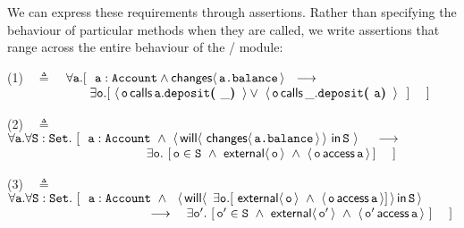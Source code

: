  
We can  express these  requirements  %
through \Chainmail assertions.  Rather than %
specifying the behaviour of particular methods when they are called, we
write  assertions   that range across the entire behaviour of the
/  module: 
\vspace{.2cm}


(1)\ \  $\triangleq$\ \ $\forall \prg{a}.[\ \ \prg{a}:\prg{Account} \wedge \Changes{\prg{a.balance}}  \ \    
    \longrightarrow \ \    \hfill$ \\
  $\strut \hspace{2.3cm} 
  \exists \prg{o}. [\    \Calls{\prg{o}}{\prg{deposit}}{\prg{a}}{\_} \vee\  \Calls{\prg{o}}{\prg{deposit}}{\_}{\prg{a}}\  \ ] \ \ \ \ ] \hfill $

\vspace{.4cm}

    (2)\ \  $\triangleq$\ \ $\forall {\mbox{\tt{a}}}.\forall {\mbox{\tt{S}}}:{\mbox{\tt{Set}}}.\ [  \ \  {\mbox{\tt{a}}}:{\mbox{\tt{Account}}}\ \wedge \  \langle\,  {\mathsf{will}}\langle \,\,{\mathsf{changes}}\langle\,{\mbox{\tt{a.balance}}}\,\rangle\,\rangle \,\, \mathsf{in}\, {\mbox{\tt{S}}}\,\, \rangle\ \ \   \
    \longrightarrow$ \\
 $\strut \hspace{3.9cm} \hfill \exists \prg{o}.\ [\, \prg{o}\in \prg{S}\ \wedge\  \External{\prg{o}}  \ \wedge \ \CanAccess{\prg{o}}{\prg{a}} \, ] \ \ \ \ ]$
\vspace{.4cm} 
 
     (3)\ \  $\triangleq$\ \ $\forall {\mbox{\tt{a}}}.\forall {\mbox{\tt{S}}}:{\mbox{\tt{Set}}}.\ [ \ \  {\mbox{\tt{a}}}:{\mbox{\tt{Account}}}\ \wedge \ \ {\langle\, {\mathsf{will}}\langle \,\ \exists {\mbox{\tt{o}}}.[\ {\mathsf{external}}\langle\, {\mbox{\tt{o}}}\, \rangle \ \wedge\ \langle\, {\mbox{\tt{o}}}\, \mathsf{access}\, {\mbox{\tt{a}}}\, \rangle]\,\rangle\, \mathsf{in}\, {{\mbox{\tt{S}}}}\, \rangle}$ \\  
 $\strut \hspace{3.9cm} \hfill   \longrightarrow \ \ \ \exists \prg{o}'.\ [\, \prg{o}'\in \prg{S}\  \wedge  \ \External{\prg{o}'}  \ \wedge \ \CanAccess{\prg{o}'}{\prg{a}}   \ ] \ \ \ \ ]$

\vspace{.2cm}


